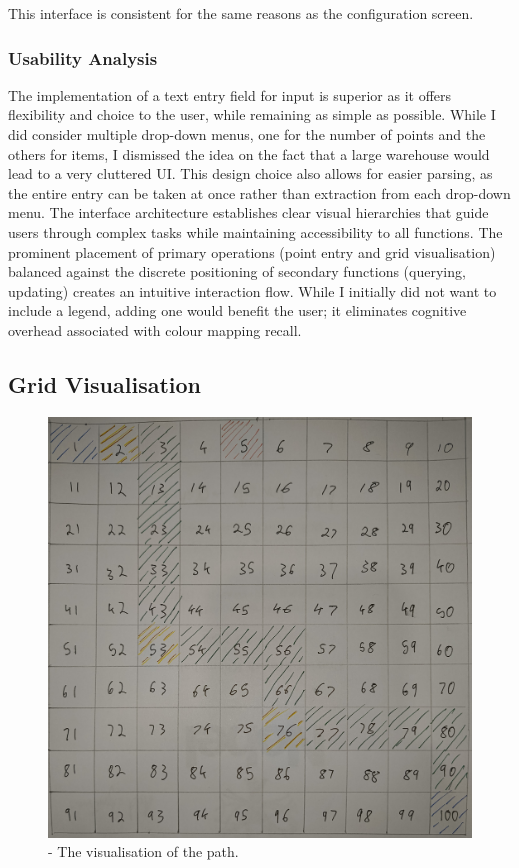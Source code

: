 This interface is consistent for the same reasons as the configuration screen.

\subsubsection{Usability Analysis}
The implementation of a text entry field for input is superior as it offers flexibility and choice to the user, while remaining as simple as possible. While I did consider multiple drop-down menus, one for the number of points and the others for items, I dismissed the idea on the fact that a large warehouse would lead to a very cluttered UI. This design choice also allows for easier parsing, as the entire entry can be taken at once rather than extraction from each drop-down menu. \newline The interface architecture establishes clear visual hierarchies that guide users through complex tasks while maintaining accessibility to all functions. The prominent placement of primary operations (point entry and grid visualisation) balanced against the discrete positioning of secondary functions (querying, updating) creates an intuitive interaction flow. \newline
While I initially did not want to include a legend, adding one would benefit the user; it eliminates cognitive overhead associated with colour mapping recall.

\newpage

\subsection{Grid Visualisation}

\begin{figure}[!htbp]
    \centering
    \includegraphics[width=1\linewidth]{gridvisual.jpg}
    \caption{- The visualisation of the path.}
\end{figure}

